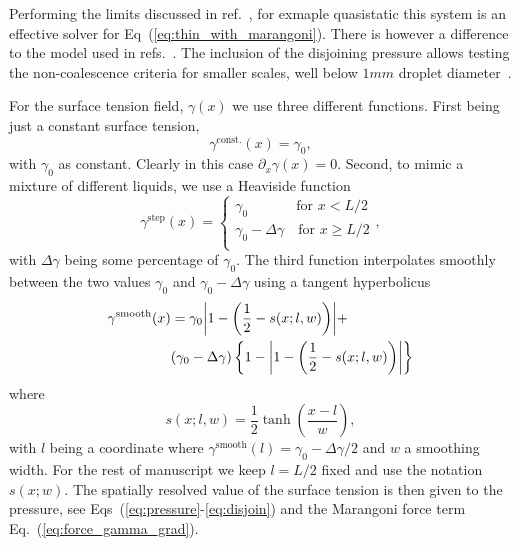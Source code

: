 \documentclass[twocolumn,amsmath,amssymb,showpacs,pre,nofootinbib,superscriptaddress]{revtex4-1} %
\begin{document}
Performing the limits discussed in ref.~\cite{PhysRevE.100.033313, PhysRevE.104.034801}, for exmaple quasistatic this system is an effective solver for Eq~(\ref{eq:thin_with_marangoni}).
There is however a difference to the model used in refs.~\cite{doi:10.1021/la500459v, karpitschka2014sharp}.
The inclusion of the disjoining pressure allows testing the non-coalescence criteria for smaller scales, well below $1mm$ droplet diameter~\cite{karpitschka2014sharp}.

For the surface tension field, $\gamma(x)$ we use three different functions. 
First being just a constant surface tension, 
\begin{equation}\label{eq:gamma_const}
    \gamma^{\text{const.}}(x) = \gamma_0,
\end{equation}
with $\gamma_0$ as constant.
Clearly in this case $\partial_x\gamma(x) = 0$.
Second, to mimic a mixture of different liquids, we use a Heaviside function
\begin{equation}\label{eq:gamma_step}
    \gamma^{\text{step}}(x) = \begin{cases}
    \gamma_0\quad~~\qquad \text{for $x < L/2$}\\
    \gamma_0 - \Delta\gamma \quad \text{for $x \ge L/2$}\\
    \end{cases},
\end{equation}
with $\Delta\gamma$ being some percentage of $\gamma_0$.
The third function interpolates smoothly between the two values $\gamma_0$ and $\gamma_0 -\Delta\gamma$ using a tangent hyperbolicus
\begin{align}\label{eq:gamma_tanh}
    \gamma^{\text{smooth}}(x) &= \gamma_0\abs{1 - \left(\frac{1}{2} - s(x;l,w)\right)} + \nonumber\\
    &(\gamma_0 - \Delta\gamma)\left\{1 - \abs{1 - \left(\frac{1}{2} - s(x;l,w)\right)}\right\} 
\end{align}
where
\begin{equation}\label{eq:smoothing}
    s(x;l,w) = \frac{1}{2}\tanh\left(\frac{x - l}{w}\right),
\end{equation}
with $l$ being a coordinate where $\gamma^{\text{smooth}}(l) = \gamma_0 -\Delta\gamma/2$ and $w$ a smoothing width. 
For the rest of manuscript we keep $l=L/2$ fixed and use the notation $s(x;w)$.
The spatially resolved value of the surface tension is then given to the pressure, see Eqs~(\ref{eq:pressure}-\ref{eq:disjoin}) and the Marangoni force term Eq.~(\ref{eq:force_gamma_grad}).
\end{document}
